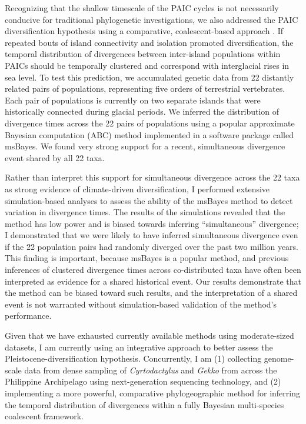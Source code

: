 \documentclass[10pt]{article}
\begin{document}
Recognizing that the shallow timescale of the PAIC cycles is not necessarily
conducive for traditional phylogenetic investigations, we also addressed the
PAIC diversification hypothesis using a comparative, coalescent-based approach
.
If repeated bouts of island connectivity and isolation promoted
diversification, the temporal distribution of divergences between inter-island
populations within PAICs should be temporally clustered and correspond with
interglacial rises in sea level.
To test this prediction, we accumulated genetic data from 22 distantly related
pairs of populations, representing five orders of terrestrial vertebrates.
Each pair of populations is currently on two separate islands that were
historically connected during glacial periods.
We inferred the distribution of divergence times across the 22 pairs of
populations using a popular approximate Bayesian computation (ABC) method
implemented in a software package called msBayes.
We found very strong support
for a recent, simultaneous divergence event shared by all 22 taxa.

Rather than interpret this support for simultaneous divergence across the 22
taxa as strong evidence of climate-driven diversification, I performed
extensive simulation-based analyses to assess the ability of the msBayes method
to detect variation in divergence times.
The results of the simulations revealed that the method has low power and is
biased towards inferring ``simultaneous'' divergence; I demonstrated that we
were likely to have inferred simultaneous divergence even if the 22 population
pairs had randomly diverged over the past two million years.
This finding is important, because msBayes is a popular method, and previous
inferences of clustered divergence times across co-distributed taxa have often
been interpreted as evidence for a shared historical event.
Our results demonstrate that the method can be biased toward such results, and
the interpretation of a shared event is not warranted without simulation-based
validation of the method's performance.

Given that we have exhausted currently available methods using moderate-sized
datasets, I am currently using an integrative approach to better assess the
Pleistocene-diversification hypothesis.  Concurrently, I am (1) collecting
genome-scale data from dense sampling of \emph{Cyrtodactylus} and \emph{Gekko}
from across the Philippine Archipelago using next-generation sequencing
technology, and (2) implementing a more powerful, comparative phylogeographic
method for inferring the temporal distribution of divergences within a fully
Bayesian multi-species coalescent framework.
\end{document}
